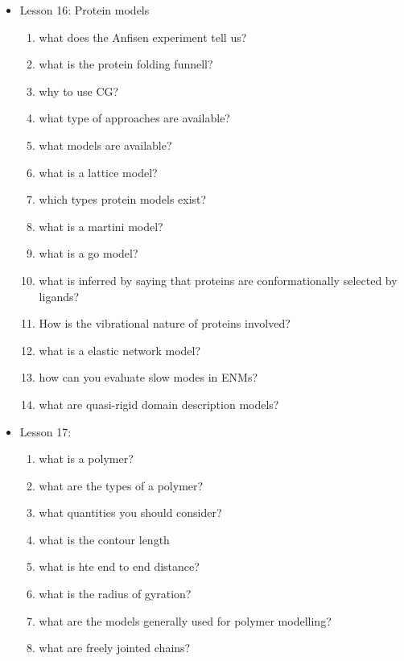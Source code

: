 {\begin{itemize}
\begin{enumerate}
        \item How does $\chi^2$ differentiate himself from relative entropy?
        \item Why Force Matching does not produce very good radial distribution functions?
    \end{enumerate}
    \item Lesson 16: Protein models
    \begin{enumerate}
        \item what does the Anfisen experiment tell us?
        \item what is the protein folding funnell?
        \item why to use CG?
        \item what type of approaches are available?
        \item what models are available?
        \item what is a lattice model?
        \item which types protein models exist?
        \item what is a martini model?
        \item what is a go model?
        \item what is inferred by saying that proteins are conformationally selected by ligands?
        \item How is the vibrational nature of proteins involved?
        \item what is a elastic network model?
        \item how can you evaluate slow modes in ENMs?
        \item what are quasi-rigid domain description models?
    \end{enumerate}
    \item Lesson 17:
    \begin{enumerate}
        \item what is a polymer?
        \item what are the types of a polymer?
        \item what quantities you should consider?
        \item what is the contour length
        \item what is hte end to end distance?
        \item what is the radius of gyration?
        \item what are the models generally used for polymer modelling?
        \item what are freely jointed chains?

\end{enumerate}
\end{itemize}}
